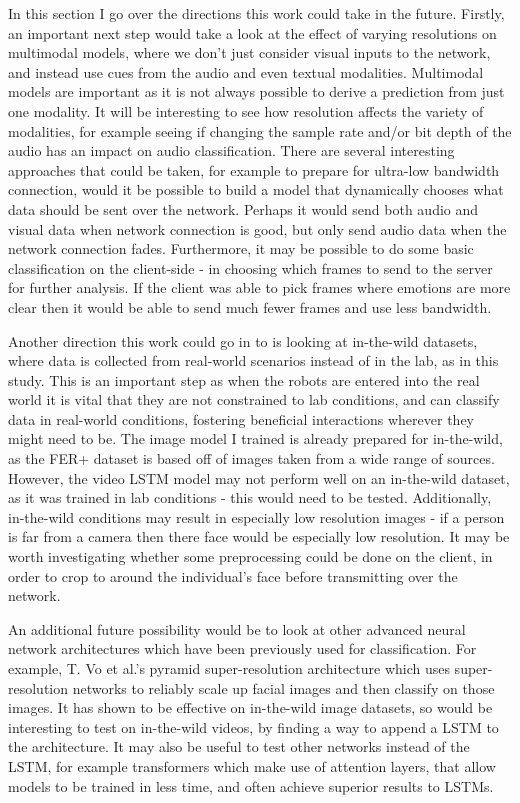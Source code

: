 \documentclass[sigconf]{acmart}
\begin{document}
{In this section I go over the directions this work could take in the future.
Firstly, an important next step would take a look at the effect of varying
resolutions on multimodal models, where
we don't just consider visual inputs to the network, and instead use cues from
the audio and even textual modalities. Multimodal models are important as it
is not always possible to derive a prediction from just one modality. 
It will be interesting to see how
resolution affects the variety of modalities, for example seeing if changing
the sample rate and/or bit depth of the audio has an impact on audio
classification. There are several interesting approaches that could be taken,
for example to prepare for ultra-low bandwidth connection, would it be
possible to build a model that dynamically chooses what data should be sent
over the network. Perhaps it would send both audio and visual data when
network connection is good, but only send audio data when the network
connection fades. Furthermore, it may be possible to do some basic
classification on the client-side - in choosing which frames to send to the
server for further analysis. If the client was able to pick frames where
emotions are more clear then it would be able to send much fewer frames and
use less bandwidth.

Another direction this work could go in to is looking at in-the-wild datasets,
where data is collected from real-world scenarios instead of in the lab, as in
this study. This is an important step as when the robots are entered into the
real world it is vital that they are not constrained to lab conditions, and
can classify data in real-world conditions, fostering beneficial interactions
wherever they might need to be. The image model I trained is already prepared
for in-the-wild, as the FER+ dataset is based off of images taken from a wide
range of sources. However, the video LSTM model may not perform well on an
in-the-wild dataset, as it was trained in lab conditions - this would need to
be tested. Additionally, in-the-wild conditions may result in especially low
resolution images - if a person is far from a camera then there face would be
especially low resolution. It may be worth investigating whether some
preprocessing could be done on the client, in order to crop to around the
individual's face before transmitting over the network.

An additional future possibility would be to look at other advanced neural
network architectures which have been previously used for classification.
For example, T. Vo et al.'s pyramid super-resolution architecture
\cite{vo2020pyramid} which uses super-resolution networks to reliably scale 
up facial images and then classify on those images. It has shown to be
effective on in-the-wild image datasets, so would be interesting to test on
in-the-wild videos, by finding a way to append a LSTM to the architecture. 
It may also be useful to test other networks instead of the LSTM, for
example transformers \cite{vaswani2017attention} which make use of attention
layers, that allow models to be trained in less time, and often achieve
superior results to LSTMs. 

}
\end{document}
